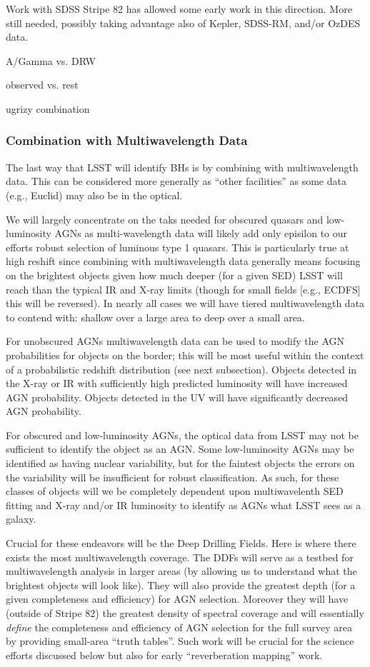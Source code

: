 Work with SDSS Stripe 82 has allowed some early work in this
direction.  More still needed, possibly taking advantage also of
Kepler, SDSS-RM, and/or OzDES data.

A/Gamma vs. DRW

observed vs. rest

ugrizy combination


\subsubsection{Combination with Multiwavelength Data}

The last way that LSST will identify BHs is by combining with multiwavelength data.  This can be considered more generally as ``other facilities'' as some data (e.g., Euclid) may also be in the optical.

We will largely concentrate on the taks needed for obscured quasars and low-luminosity AGNs as multi-wavelength data will likely add only episilon to our efforts robust selection of luminous type 1 quasars.  This is particularly true at high reshift since combining with multiwavelength data generally means focusing on the brightest objects given how much deeper (for a given SED) LSST will reach than the typical IR and X-ray limits (though for small fields [e.g., ECDFS] this will be reversed).  In nearly all cases we will have tiered multiwavelength data to contend with: shallow over a large area to deep over a small area.

For unobscured AGNs multiwavelength data can be used to modify the AGN probabilities for objects on the border; this will be most useful within the context of a probabilistic redshift distribution (see next subsection).  Objects detected in the X-ray or IR with sufficiently high predicted luminosity will have increased AGN probability.  Objects detected in the UV will have significantly decreased AGN probability.

For obscured and low-luminosity AGNs, the optical data from LSST may not be sufficient to identify the object as an AGN.  Some low-luminosity AGNs may be identified as having nuclear variability, but for the faintest objects the errors on the variability will be insufficient for robust classification.  As such, for these classes of objects will we be completely dependent upon multiwavelenth SED fitting and X-ray and/or IR luminosity to identify as AGNs what LSST sees as a galaxy.

Crucial for these endeavors will be the Deep Drilling Fields.  Here is where there exists the most multiwavelength coverage.  The DDFs will serve as a testbed for multiwavelength analysis in larger areas (by allowing us to understand what the brightest objects will look like).  They will also provide the greatest depth (for a given completeness and efficiency) for AGN selection.  Moreover they will have (outside of Stripe 82) the greatest density of spectral coverage and will essentially {\em define} the completeness and efficiency of AGN selection for the full survey area by providing small-area ``truth tables''.  Such work will be crucial for the science efforts discussed below but also for early ``reverberation mapping'' work.

